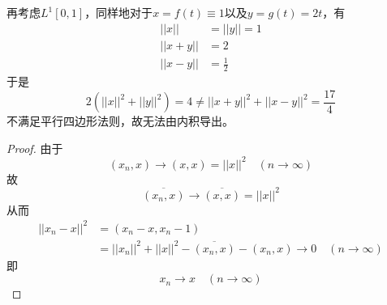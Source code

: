 \documentclass[cn]{homework}
\begin{document}
    再考虑$L^1[0,1]$，同样地对于$x=f(t)\equiv 1$以及$y=g(t)=2t$，有
    \[\begin{aligned}
        ||x||&=||y||=1\\
        ||x+y||&=2\\
        ||x-y||&=\frac{1}{2}
    \end{aligned}\]
    于是
    \[2(||x||^2+||y||^2)=4\neq ||x+y||^2+||x-y||^2=\frac{17}{4}\]
    不满足平行四边形法则，故无法由内积导出。

    \problem
    \begin{proof}
        由于
        \[(x_n,x)\to(x,x)=||x||^2\quad(n\to\infty)\]
        故
        \[\overline{(x_n,x)}\to\overline{(x,x)}=||x||^2\]
        从而
        \[\begin{aligned}
            ||x_n-x||^2&=(x_n-x,x_n-1)\\
            &=||x_n||^2+||x||^2-\overline{(x_n,x)}-(x_n,x)
            \to 0
            \quad(n\to\infty)
        \end{aligned}\]
        即
        \[x_n\to x\quad(n\to\infty)\]
    \end{proof}
\end{document}

